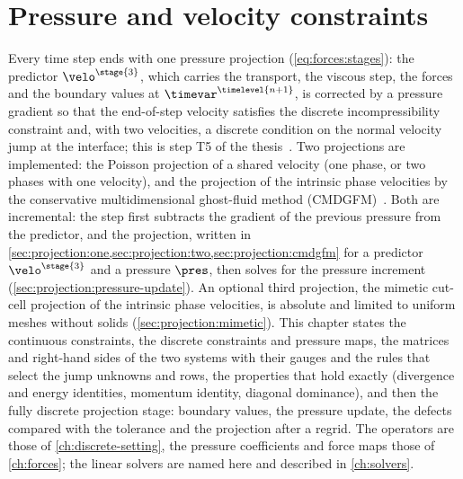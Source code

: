 \chapter{Pressure and velocity constraints}\label{ch:projection}
Every time step ends with one pressure projection (\cref{eq:forces:stages}):
the predictor $\velo^{\stage{3}}$, which carries the transport, the viscous
step, the forces and the boundary values at $\timevar^{\timelevel{n+1}}$, is
corrected by a pressure gradient so that the end-of-step velocity satisfies
the discrete incompressibility constraint and, with two velocities, a discrete
condition on the normal velocity jump at the interface; this is step T5 of
the thesis~. Two projections are implemented: the Poisson
projection of a shared velocity (one phase, or two phases with one velocity),
and the projection of the intrinsic phase velocities by the conservative
multidimensional ghost-fluid method (CMDGFM)~. Both are
incremental: the step first subtracts the gradient of the previous pressure
from the predictor, and the projection, written in
\cref{sec:projection:one,sec:projection:two,sec:projection:cmdgfm} for a
predictor $\velo^{\stage{3}}$ and a pressure $\pres$, then solves for the
pressure increment (\cref{sec:projection:pressure-update}). An optional third
projection, the mimetic cut-cell projection of the intrinsic phase velocities,
is absolute and limited to uniform meshes without solids
(\cref{sec:projection:mimetic}). This chapter states the continuous
constraints, the discrete constraints and pressure maps, the matrices and
right-hand sides of the two systems with their gauges and the rules that
select the jump unknowns and rows, the properties that hold exactly
(divergence and energy identities, momentum identity, diagonal dominance), and
then the fully discrete projection stage: boundary values, the pressure
update, the defects compared with the tolerance and the projection after a
regrid. The operators are those of \cref{ch:discrete-setting}, the pressure
coefficients and force maps those of \cref{ch:forces}; the linear solvers are
named here and described in \cref{ch:solvers}.

